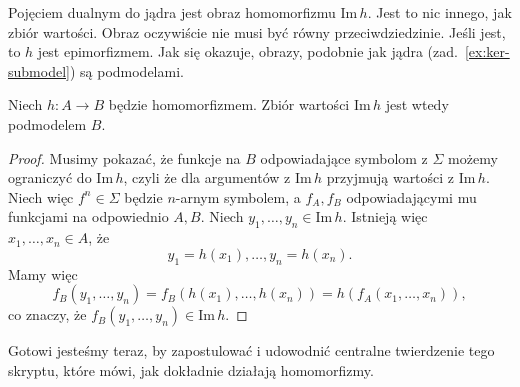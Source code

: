 Pojęciem dualnym do jądra jest obraz homomorfizmu $\mathrm{Im}\,h$.
Jest to nic innego,
	jak zbiór wartości.
Obraz oczywiście nie musi być równy przeciwdziedzinie.
Jeśli jest,
	to $h$ jest epimorfizmem.
Jak się okazuje,
	obrazy,
	podobnie jak jądra (zad.~\ref{ex:ker-submodel}) są podmodelami.

\begin{lemma}
	Niech $h: A \to B$ będzie homomorfizmem.
	Zbiór wartości $\mathrm{Im}\,h$ jest wtedy podmodelem $B$.
\end{lemma}
\begin{proof}
	Musimy pokazać,
		że funkcje na $B$ odpowiadające symbolom z $\Sigma$ możemy ograniczyć do $\mathrm{Im}\,h$,
		czyli że dla argumentów z $\mathrm{Im}\,h$ przyjmują wartości z $\mathrm{Im}\,h$.
	Niech więc $f^n \in \Sigma$ będzie $n$-arnym symbolem,
		a $f_A, f_B$ odpowiadającymi mu funkcjami na odpowiednio $A, B$.
	Niech $y_1, \dots, y_n \in \mathrm{Im}\,h$.
	Istnieją więc $x_1, \dots, x_n \in A$,
		że
	\begin{equation}
		y_1 = h(x_1), \dots, y_n = h(x_n).
	\end{equation}
	Mamy więc
	\begin{equation}
		f_B(y_1, \dots, y_n) = f_B(h(x_1), \dots, h(x_n)) = h(f_A(x_1, \dots, x_n)),
	\end{equation}
	co znaczy,
		że $f_B(y_1, \dots, y_n) \in \mathrm{Im}\,h$.
\end{proof}

Gotowi jesteśmy teraz,
	by zapostulować i udowodnić centralne twierdzenie tego skryptu,
	które mówi,
	jak dokładnie działają homomorfizmy.

